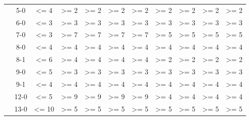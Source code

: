 \documentclass{article}
\theoremstyle{remark}
\begin{document}
{\begin{table}[ht]
\begin{tabular}{|cc||c||c|c|c|c||c|c|c|c|}
                                              & 5-0                      & \textless{}= 4           & \textgreater{}= 2  & \textgreater{}= 2  & \textgreater{}= 2 & \textgreater{}= 2 & \textgreater{}= 2  & \textgreater{}= 2  & \textgreater{}= 2 & \textgreater{}= 2  \\ \cline{2-11} 
                                              & 6-0                      & \textless{}= 3           & \textgreater{}= 3  & \textgreater{}= 3  & \textgreater{}= 3 & \textgreater{}= 3 & \textgreater{}= 3  & \textgreater{}= 3  & \textgreater{}= 3 & \textgreater{}= 3  \\ \cline{2-11} 
                                              & 7-0                      & \textless{}= 3           & \textgreater{}= 7  & \textgreater{}= 7  & \textgreater{}= 7 & \textgreater{}= 7 & \textgreater{}= 5  & \textgreater{}= 5  & \textgreater{}= 5 & \textgreater{}= 5  \\ \cline{2-11} 
                                              & 8-0                      & \textless{}= 4           & \textgreater{}= 4  & \textgreater{}= 4  & \textgreater{}= 4 & \textgreater{}= 4 & \textgreater{}= 4  & \textgreater{}= 4  & \textgreater{}= 4 & \textgreater{}= 4  \\ \cline{2-11} 
                                              & 8-1                      & \textless{}= 6           & \textgreater{}= 4  & \textgreater{}= 4  & \textgreater{}= 4 & \textgreater{}= 4 & \textgreater{}= 2  & \textgreater{}= 2  & \textgreater{}= 2 & \textgreater{}= 2  \\ \cline{2-11} 
                                              & 9-0                      & \textless{}= 5           & \textgreater{}= 3  & \textgreater{}= 3  & \textgreater{}= 3 & \textgreater{}= 3 & \textgreater{}= 3  & \textgreater{}= 3  & \textgreater{}= 3 & \textgreater{}= 3  \\ \cline{2-11} 
                                              & 9-1                      & \textless{}= 4           & \textgreater{}= 4  & \textgreater{}= 4  & \textgreater{}= 4 & \textgreater{}= 4 & \textgreater{}= 4  & \textgreater{}= 4  & \textgreater{}= 4 & \textgreater{}= 4  \\ \cline{2-11} 
                                              & 12-0                     & \textless{}= 5           & \textgreater{}= 9  & \textgreater{}= 9  & \textgreater{}= 9 & \textgreater{}= 9 & \textgreater{}= 4  & \textgreater{}= 4  & \textgreater{}= 4 & \textgreater{}= 4  \\ \cline{2-11} 
                                              & 13-0                     & \textless{}= 10          & \textgreater{}= 5  & \textgreater{}= 5  & \textgreater{}= 5 & \textgreater{}= 5 & \textgreater{}= 5  & \textgreater{}= 5  & \textgreater{}= 5 & \textgreater{}= 5  \\ \cline{2-11} 

\end{tabular}
\end{table}}
\end{document}
